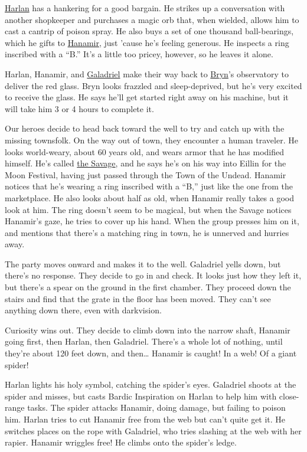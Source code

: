 \documentclass[smalldemyvopaper,11pt,twoside,onecolumn,openright,extrafontsizes]{memoir}
\begin{document}
\href{/characters/harlan/}{Harlan} has a hankering for a good bargain.
He strikes up a conversation with another shopkeeper and purchases a
magic orb that, when wielded, allows him to cast a cantrip of poison
spray. He also buys a set of one thousand ball-bearings, which he gifts
to \href{/characters/hanamir/}{Hanamir}, just 'cause he's feeling
generous. He inspects a ring inscribed with a ``B.'' It's a little too
pricey, however, so he leaves it alone.

Harlan, Hanamir, and \href{/characters/galadriel/}{Galadriel} make their
way back to \href{/characters/bryn/}{Bryn}'s observatory to deliver the
red glass. Bryn looks frazzled and sleep-deprived, but he's very excited
to receive the glass. He says he'll get started right away on his
machine, but it will take him 3 or 4 hours to complete it.

Our heroes decide to head back toward the well to try and catch up with
the missing townsfolk. On the way out of town, they encounter a human
traveler. He looks world-weary, about 60 years old, and wears armor that
he has modified himself. He's called \href{/characters/the-savage/}{the
Savage}, and he says he's on his way into Eillin for the Moon Festival,
having just passed through the Town of the Undead. Hanamir notices that
he's wearing a ring inscribed with a ``B,'' just like the one from the
marketplace. He also looks about half as old, when Hanamir really takes
a good look at him. The ring doesn't seem to be magical, but when the
Savage notices Hanamir's gaze, he tries to cover up his hand. When the
group presses him on it, and mentions that there's a matching ring in
town, he is unnerved and hurries away.

The party moves onward and makes it to the well. Galadriel yells down,
but there's no response. They decide to go in and check. It looks just
how they left it, but there's a spear on the ground in the first
chamber. They proceed down the stairs and find that the grate in the
floor has been moved. They can't see anything down there, even with
darkvision.

Curiosity wins out. They decide to climb down into the narrow shaft,
Hanamir going first, then Harlan, then Galadriel. There's a whole lot of
nothing, until they're about 120 feet down, and then\ldots{} Hanamir is
caught! In a web! Of a giant spider!

Harlan lights his holy symbol, catching the spider's eyes. Galadriel
shoots at the spider and misses, but casts Bardic Inspiration on Harlan
to help him with close-range tasks. The spider attacks Hanamir, doing
damage, but failing to poison him. Harlan tries to cut Hanamir free from
the web but can't quite get it. He switches places on the rope with
Galadriel, who tries slashing at the web with her rapier. Hanamir
wriggles free! He climbs onto the spider's ledge.
\end{document}
